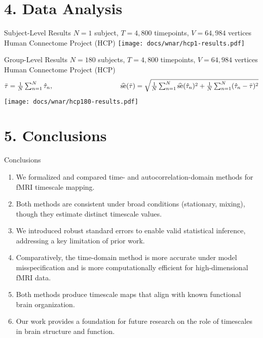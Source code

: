 \documentclass[8pt,aspectratio=169]{beamer}
\begin{document}
\section{4. Data Analysis}


\begin{frame}{Subject-Level Results}
$N = 1$ subject, \;$T = 4,800$ timepoints,\; $V = 64,984$ vertices \hfill Human Connectome Project (HCP)
\vfill
\centering
\texttt{[image: docs/wnar/hcp1-results.pdf]}
\end{frame}

\begin{frame}{Group-Level Results}
\vfill
$N = 180$ subjects, \;$T = 4,800$ timepoints,\; $V = 64,984$ vertices \hfill  Human Connectome Project (HCP)
\begin{align*}
    \textstyle
    \bar\tau = \frac{1}{N} \sum_{n=1}^N \hat\tau_n, \hspace{3.5cm} \widehat{\text{se}}(\bar\tau) = \sqrt{\frac{1}{N} \sum_{n=1}^N \widehat{\text{se}}(\hat\tau_n)^2 + \frac{1}{N} \sum_{n=1}^N (\hat\tau_n - \bar\tau)^2}
\end{align*}
\vfill
\centering
\texttt{[image: docs/wnar/hcp180-results.pdf]}
\end{frame}

\section{5. Conclusions}

\begin{frame}{Conclusions}
\begin{enumerate}
    \item We formalized and compared time- and autocorrelation-domain methods for fMRI timescale mapping.
    \vspace{2mm}
    \item Both methods are consistent under broad conditions (stationary, mixing), though they estimate distinct timescale values.
    \vspace{2mm}
    \item We introduced robust standard errors to enable valid statistical inference, addressing a key limitation of prior work.
    \vspace{2mm}
    \item Comparatively, the time-domain method is more accurate under model misspecification and is more computationally efficient for high-dimensional fMRI data.
    \vspace{2mm}
    \item Both methods produce timescale maps that align with known functional brain organization.
    \vspace{2mm}
    \item Our work provides a foundation for future research on the role of timescales in brain structure and function.
\end{enumerate}
\end{frame}
\end{document}
